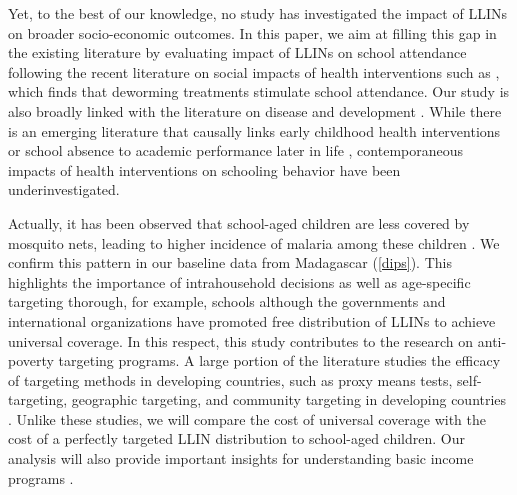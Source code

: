 \documentclass[fleqn,11pt]{article}
\begin{document}
Yet, to the best of our knowledge, no study has investigated the impact of LLINs on broader socio-economic outcomes. In this paper, we aim at filling this gap in the existing literature by evaluating impact of LLINs on school attendance following the recent literature on social impacts of health interventions such as \cite{miguel_worms:_2004}, which finds that deworming treatments stimulate school attendance. Our study is also broadly linked with the literature on disease and development \citep{acemoglu_colonial_2001,bleakley_malaria_2010,almond_is_2006,alsan_effect_2015}. While there is an emerging literature that causally links early childhood health interventions or school absence to academic performance later in life \citep{field_iodine_2009,bharadwaj_early_2013,cattan_long-term_2023}, contemporaneous impacts of health interventions on schooling behavior have been underinvestigated.



Actually, it has been observed that school-aged children are less covered by mosquito nets, leading to higher incidence of malaria among these children \citep{noor_use_2009}. We confirm this pattern in our baseline data from Madagascar (\autoref{dips}). This highlights the importance of intrahousehold decisions as well as age-specific targeting thorough, for example, schools although the governments and international organizations have promoted free distribution of LLINs to achieve universal coverage. In this respect, this study contributes to the research on anti-poverty targeting programs. A large portion of the literature studies the efficacy of targeting methods in developing countries, such as proxy means tests, self-targeting, geographic targeting, and community targeting in developing countries \citep{nichols_targeting_1982,coady_targeting_2004,elbers_poverty_2007,ravallion_how_2009,alatas_targeting_2012,brown_poor_2016}. Unlike these studies, we will compare the cost of universal coverage with the cost of a perfectly targeted LLIN distribution to school-aged children. Our analysis will also provide important insights for understanding basic income programs \citep{ravallion_vox,hanna_universal_2018,banerjee_universal_2019}.
\end{document}
